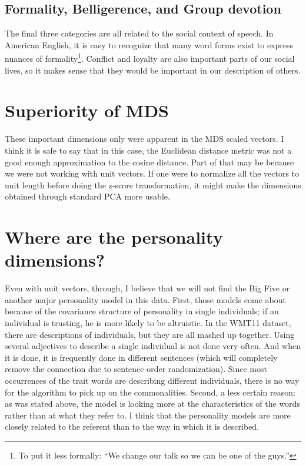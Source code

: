 \subsection{Formality, Belligerence, and Group devotion}

The final three categories are all related to the social context of speech. In
American English, it is easy to recognize that many word forms exist to express
nuances of formality\footnote{To put it less formally: ``We change our
talk so we can be one of the guys.''}. Conflict and loyalty are also important
parts of our social lives, so it makes sense that they would be important in
our description of others.

\section{Superiority of MDS}

These important dimensions only were apparent in the MDS scaled vectors. I think
it is safe to say that in this case, the Euclidean distance metric was not a
good enough approximation to the cosine distance. Part of that may be because
we were not working with unit vectors. If one were to normalize all the vectors 
to unit length before doing the z-score transformation, it might make the 
dimensions obtained through standard PCA more usable.

\section{Where are the personality dimensions?}

Even with unit vectors, through, I believe that we will not find the Big Five or 
another major personality model in this data. First, those models come about 
because of the covariance structure of personality in single individuals; if an 
individual is trusting, he is more likely to be altruistic. In the WMT11 
dataset, there are descriptions of individuals, but they are all mashed up 
together. Using several adjectives to describe a single individual is not done 
very often. And when it is done, it is frequently done in different sentences 
(which will completely remove the connection due to sentence order 
randomization). Since most occurrences of the trait words are describing 
different individuals, there is no way for the algorithm to pick up on the 
commonalities. Second, a less certain reason: as was stated above, the model is 
looking more at the characteristics of the words rather than at what they refer 
to. I think that the personality models are more closely related to the referent 
than to the way in which it is described.

